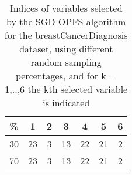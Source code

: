 \begin{table}
	\begin{center}
		\begin{tabular}{c c c c c c c}
			\% & 1 & 2 & 3 & 4 & 5 & 6 \\
			\hline
			30 & 23 & 3 & 13 & 22 & 21 & 2 \\
			70 & 23 & 3 & 13 & 22 & 21 & 2 \\
		\end{tabular}
	\end{center}
	\caption{Indices of variables selected by the SGD-OPFS algorithm for the breastCancerDiagnosis dataset, using different random sampling percentages, and for k = 1,..,6 the kth selected variable is indicated}
\end{table}